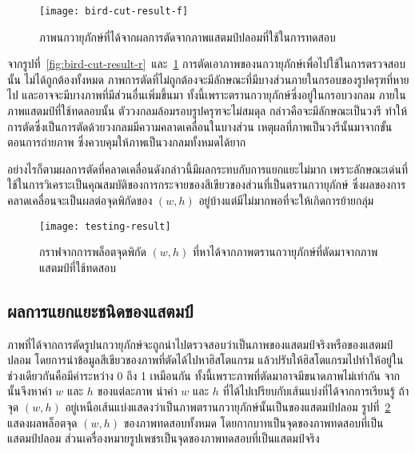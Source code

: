 \begin{figure}[!ht]
\centering
\texttt{[image: bird-cut-result-f]}
\caption{ภาพนกวายุภักษ์ที่ได้จากผลการตัดจากภาพแสตมป์ปลอมที่ใช้ในการทดสอบ}
\label{fig:bird-cut-result-f}
\end{figure}
 

จากรูปที่~\ref{fig:bird-cut-result-r}~และ~\ref{fig:bird-cut-result-f} การตัดเอาภาพของนกวายุภักษ์เพื่อไปใช้ในการตรวจสอบนั้น ไม่ได้ถูกต้องทั้งหมด ภาพการตัดที่ไม่ถูกต้องจะมีลักษณะที่มีบางส่วนภายในกรอบของรูปครุฑที่หายไป และอาจจะมีบางภาพที่มีส่วนอื่นเพิ่มขึ้นมา  ทั้งนี้เพราะตรานกวายุภักษ์ซี่งอยู่ในกรอบวงกลม ภายในภาพแสตมป์ที่ใช้ทดลอบนั้น ตัววงกลมล้อมรอบรูปครุฑจะไม่สมดุล  กล่าวคือจะมีลักษณะเป็นวงรี  ทำให้การตัดซึ่งเป็นการตัดด้วยวงกลมมีความคลาดเคลื่อนในบางส่วน เหตุผลที่ภาพเป็นวงรีนั้นมาจากขั้นตอนการถ่ายภาพ ซึ่งควบคุมให้ภาพเป็นวงกลมทั้งหมดได้ยาก

อย่างไรก็ตามผลการตัดที่คลาดเคลื่อนดังกล่าวนี้มีผลกระทบกับการแยกแยะไม่มาก เพราะลักษณะเด่นที่ใช้ในการวิเคราะเป็นคุณสมบัติของการกระจายของสีเขียวของส่วนที่เป็นตรานกวายุภักษ์ ซึ่งผลของการคลาดเคลื่อนจะเป็นผลต่อจุดพิกัดของ $(w, h)$ อยู่บ้างแต่มีไม่มากพอที่จะให้เกิดการย้ายกลุ่ม

\begin{figure}[!hb]
\centering
\vspace{2em}
\texttt{[image: testing-result]}
\vspace{2em}
\caption{กราฟจากการพล็อตจุดพิกัด $(w,h)$ ที่หาได้จากภาพตรานกวายุภักษ์ที่ตัดมาจากภาพแสตมป์ที่ใช้ทดสอบ}
\label{fig:classification-result}
\end{figure}

\subsection{ผลการแยกแยะชนิดของแสตมป์} 

ภาพที่ได้จากการตัดรูปนกวายุภักษ์จะถูกนำไปตรวจสอบว่าเป็นภาพของแสตมป์จริงหรือของแสตมป์ปลอม โดยการนำข้อมูลสีเขียวของภาพที่ตัดได้ไปหาฮิสโตแกรม แล้วปรับให้ฮิสโตแกรมไปทำให้อยู่ในช่วงเดียวกันคือมีค่าระหว่าง 0 ถึง 1 เหมือนกัน ทั้งนี้เพราะภาพที่ตัดมาอาจมีขนาดภาพไม่เท่ากัน จากนั้นจึงหาค่า $w$ และ $h$ ของแต่ละภาพ นำค่า $w$ และ $h$ ที่ได้ไปเปรียบกับเส้นแบ่งที่ได้จากการเรียนรู้ ถ้าจุด $(w,h)$ อยู่เหนือเส้นแบ่งแสดงว่าเป็นภาพตรานกวายุภักษ์นั้นเป็นของแสตมป์ปลอม รูปที่~\ref{fig:classification-result} แสดงผลพล็อตจุด $(w,h)$ ของภาพทดสอบทั้งหมด โดยกากบาทเป็นจุดของภาพทดสอบที่เป็นแสตมป์ปลอม ส่วนเครื่องหมายรูปเพชรเป็นจุดของภาพทดสอบที่เป็นแสตมป์จริง 



